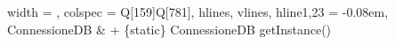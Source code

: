 \begin{longtblr}[
    label = none,
    entry = none,
  ]{
    width = \linewidth,
    colspec = {Q[159]Q[781]},
    hlines,
    vlines,
    hline{1,23} = {-}{0.08em},
  }
  ConnessioneDB          & + \{static\} ConnessioneDB getInstance()                                                                                                                                                                                                                                                                                                                                                                                                                                                                                                                                                                                                                                                                                                                                                                                                                                                                                                                                                                                                                                                                                                                                                                                                                                                                                                                                                                                                                                                                                                                                                                                                                                                                                                                                                                                                                                                        \\

\end{longtblr}

